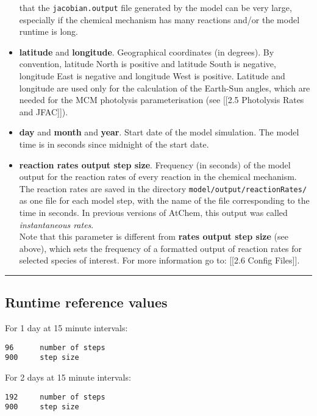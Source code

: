 \begin{itemize}
  that the \texttt{jacobian.output} file generated by the model can be
  very large, especially if the chemical mechanism has many reactions
  and/or the model runtime is long.
\item
  \textbf{latitude} and \textbf{longitude}. Geographical coordinates (in
  degrees). By convention, latitude North is positive and latitude South
  is negative, longitude East is negative and longitude West is
  positive. Latitude and longitude are used only for the calculation of
  the Earth-Sun angles, which are needed for the MCM photolysis
  parameterisation (see {[}{[}2.5 Photolysis Rates and JFAC{]}{]}).
\item
  \textbf{day} and \textbf{month} and \textbf{year}. Start date of the
  model simulation. The model time is in seconds since midnight of the
  start date.
\item
  \textbf{reaction rates output step size}. Frequency (in seconds) of
  the model output for the reaction rates of every reaction in the
  chemical mechanism. The reaction rates are saved in the directory
  \texttt{model/output/reactionRates/} as one file for each model step,
  with the name of the file corresponding to the time in seconds. In
  previous versions of AtChem, this output was called
  \emph{instantaneous rates}.\\
  Note that this parameter is different from \textbf{rates output step
  size} (see above), which sets the frequency of a formatted output of
  reaction rates for selected species of interest. For more information
  go to: {[}{[}2.6 Config Files{]}{]}.
\end{itemize}

\begin{center}\rule{0.5\linewidth}{\linethickness}\end{center}

\subsection{Runtime reference values} \label{runtime-reference-values}

For 1 day at 15 minute intervals:

\begin{verbatim}
96      number of steps
900     step size
\end{verbatim}

For 2 days at 15 minute intervals:

\begin{verbatim}
192     number of steps
900     step size
\end{verbatim}

